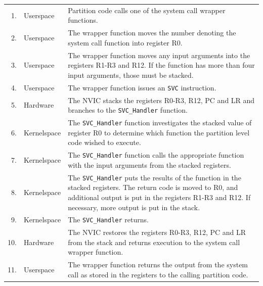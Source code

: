 \noindent\begin{tabular}{ r l p{10.5cm} }
    1. & Userspace & Partition code calls one of the system call wrapper
    functions.\\
    2. & Userspace & The wrapper function moves the number denoting the system
    call function into register R0.\\
    3. & Userspace & The wrapper function moves any input arguments into the
    registers R1-R3 and R12. If the function has more than four input arguments,
    those must be stacked.\\
    4. & Userspace & The wrapper function issues an \texttt{SVC} instruction.\\
    5. & Hardware & The NVIC stacks the registers R0-R3, R12, PC and LR and
    branches to the \texttt{SVC\_Handler} function.\\
    6. & Kernelspace & The \texttt{SVC\_Handler} function investigates the
    stacked value of register R0 to determine which function the partition level
    code wished to execute.\\
    7. & Kernelspace & The \texttt{SVC\_Handler} function calls the appropriate
    function with the input arguments from the stacked registers.\\
    8. & Kernelspace & The \texttt{SVC\_Handler} puts the results of the
    function in the stacked registers. The return code is moved to R0, and
    additional output is put in the registers R1-R3 and R12. If necessary, more
    output is put in the stack.\\
    9. & Kernelspace & The \texttt{SVC\_Handler} returns.\\
    10. & Hardware & The NVIC restores the registers R0-R3, R12, PC and LR from
    the stack and returns execution to the system call wrapper function.\\
    11. & Userspace & The wrapper function returns the output from the system
    call as stored in the registers to the calling partition code.\\
\end{tabular}\\


